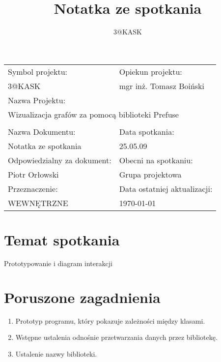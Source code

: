 \documentclass[a4paper,10pt]{article}
\title{Notatka ze spotkania}
\author{3@KASK}
\begin{document}



\maketitle


\begin{center}
\begin{tabular}{|p{7cm}|p{7cm}|}
\hline
Symbol projektu: & Opiekun projektu:   \tabularnewline 
3@KASK & mgr inż. Tomasz Boiński    \tabularnewline \hline
\multicolumn{2}{|l|}{Nazwa Projektu: } \tabularnewline
\multicolumn{2}{|l|}{Wizualizacja grafów za pomocą biblioteki Prefuse } \tabularnewline 
\hline
\multicolumn{2}{l}{ } \tabularnewline %
\hline 
Nazwa Dokumentu: & Data spotkania:   \tabularnewline 
Notatka ze spotkania & 25.05.09 \tabularnewline \hline
Odpowiedzialny za dokument: & Obecni na spotkaniu:   \tabularnewline 
Piotr Orłowski & Grupa projektowa \tabularnewline \hline
Przeznaczenie: & Data ostatniej aktualizacji:   \tabularnewline 
WEWNĘTRZNE & \today \tabularnewline \hline
\end{tabular}
\end{center}



\section{Temat spotkania}
Prototypowanie i diagram interakcji

\section{Poruszone zagadnienia}
\begin{enumerate}
\item Prototyp programu, który pokazuje zależności między klasami.
\item Wstępne ustalenia odnośnie przetwarzania danych przez bibliotekę.
\item Ustalenie nazwy biblioteki.
\end{enumerate}
\end{document}
